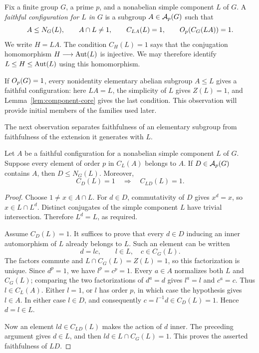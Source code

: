 \begin{definition}\label{def:faithful-configuration}
Fix a finite group $G$, a prime $p$, and a nonabelian simple component
$L$ of $G$.  A \emph{faithful configuration for $L$ in $G$} is a subgroup
$A\in\mathcal A_p(G)$ such that
\[
 A\le N_G(L),\qquad A\cap L\ne1,\qquad
 C_{LA}(L)=1,\qquad O_p(C_G(LA))=1.
\]
We write $H=LA$.  The condition $C_H(L)=1$ says that the conjugation
homomorphism $H\longrightarrow\operatorname{Aut}(L)$ is injective.  We may therefore
identify $L\le H\le\operatorname{Aut}(L)$ using this homomorphism.
\end{definition}

If $O_p(G)=1$, every nonidentity elementary abelian subgroup $A\le L$
gives a faithful configuration: here $LA=L$, the simplicity of $L$
gives $Z(L)=1$, and Lemma~\ref{lem:component-core} gives the last
condition.  This observation will provide initial members of the
families used later.

The next observation separates faithfulness of an elementary subgroup
from faithfulness of the extension it generates with $L$.

\begin{lemma}\label{lem:faithfulness-upgrade}
Let $A$ be a faithful configuration for a nonabelian simple component
$L$ of $G$.  Suppose every element of order $p$ in $C_L(A)$ belongs
to $A$.  If $D\in\mathcal A_p(G)$ contains $A$, then $D\le N_G(L)$.
Moreover,
\[
 C_D(L)=1\quad\Longrightarrow\quad C_{LD}(L)=1.
\]
\end{lemma}

\begin{proof}
Choose $1\ne x\in A\cap L$.  For $d\in D$, commutativity of $D$
gives $x^d=x$, so $x\in L\cap L^d$.  Distinct conjugates of the simple
component $L$ have trivial intersection.  Therefore $L^d=L$, as required.

Assume $C_D(L)=1$.  It suffices to prove that every $d\in D$ inducing
an inner automorphism of $L$ already belongs to $L$.  Such an element
can be written
\[
 d=lc,\qquad l\in L,\quad c\in C_G(L).
\]
The factors commute and $L\cap C_G(L)=Z(L)=1$, so this factorization
is unique.  Since $d^p=1$, we have $l^p=c^p=1$.  Every $a\in A$
normalizes both $L$ and $C_G(L)$; comparing the two factorizations of
$d^a=d$ gives $l^a=l$ and $c^a=c$.  Thus $l\in C_L(A)$.
Either $l=1$, or $l$ has order $p$, in which case the hypothesis gives
$l\in A$.  In either case $l\in D$, and consequently
$c=l^{-1}d\in C_D(L)=1$.  Hence $d=l\in L$.

Now an element $ld\in C_{LD}(L)$ makes the action of $d$ inner.
The preceding argument gives $d\in L$, and then
$ld\in L\cap C_G(L)=1$.  This proves the asserted faithfulness of $LD$.
\end{proof}

